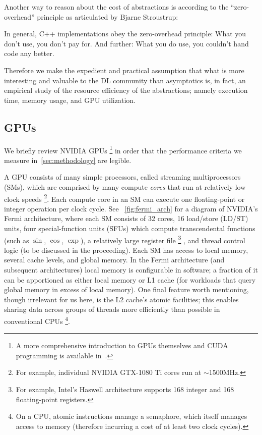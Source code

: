 Another way to reason about the cost of abstractions is according to the ``zero-overhead'' principle as articulated by Bjarne Stroustrup:
\begin{displayquote}[\cite{10.1007/978-3-642-28869-2_1}]
    In general, C++ implementations obey the zero-overhead principle: What you don't use, you don't pay for.
    And further: What you do use, you couldn't hand code any better.
\end{displayquote}
Therefore we make the expedient and practical assumption that what is more interesting and valuable to the DL community than asymptotics is, in fact, an empirical study of the resource efficiency of the abstractions;
namely execution time, memory usage, and GPU utilization.



\subsection{GPUs}\label{subsec:gpus}

We briefly review NVIDIA GPUs%
\footnote{A more comprehensive introduction to GPUs themselves and CUDA programming is available in~\cite{10.5555/1891996}.}
in order that the performance criteria we measure in~\cref{sec:methodology} are legible.

A GPU consists of many simple processors, called streaming multiprocessors (SMs), which are comprised by many compute \textit{cores} that run at relatively low clock speeds%
\footnote{For example, individual NVIDIA GTX-1080 Ti cores run at $\sim$1500MHz.}.
Each compute core in an SM can execute one floating-point or integer operation per clock cycle.
See ~\cref{fig:fermi_arch} for a diagram of NVIDIA's Fermi architecture, where each SM consists of 32 cores, 16 load/store (LD/ST) units, four special-function units (SFUs) which compute transcendental functions (such as $\sin$, $\cos$, $\exp$), a relatively large register file%
\footnote{For example, Intel's Haswell architecture supports 168 integer and 168 floating-point registers.}%
, and thread control logic (to be discussed in the proceeding).
Each SM has access to local memory, several cache levels, and global memory.
In the Fermi architecture (and subsequent architectures) local memory is configurable in software;
a fraction of it can be apportioned as either local memory or L1 cache (for workloads that query global memory in excess of local memory).
One final feature worth mentioning, though irrelevant for us here, is the L2 cache's atomic  facilities;
this enables sharing data across groups of threads more efficiently than possible in conventional CPUs%
\footnote{On a CPU, atomic  instructions manage a semaphore, which itself manages access to memory (therefore incurring a cost of at least two clock cycles).}.

